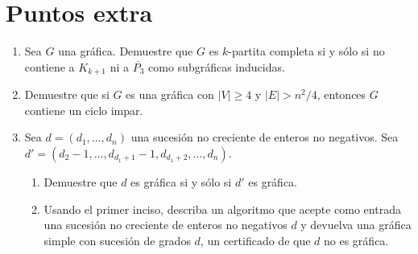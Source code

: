 \documentclass{article}
\begin{document}
\section*{Puntos extra}

\begin{enumerate}
\item Sea $G$ una gr\'afica.   Demuestre que $G$ es $k$-partita completa si y
  s\'olo si no contiene a $K_{k+1}$ ni a $\overline{P_3}$ como subgr\'aficas
  inducidas.
\item Demuestre que si $G$ es una gr\'afica con $|V| \ge 4$ y $|E| > n^2/4$,
  entonces $G$ contiene un ciclo impar.
\item Sea $d = (d_1, \dots, d_n)$ una sucesi\'on no creciente de enteros no
  negativos. Sea $d' = (d_2-1, \dots, d_{d_1+1}-1, d_{d_1+2}, \dots, d_n)$.
  \begin{enumerate}
  \item Demuestre que $d$ es gr\'afica si y s\'olo si $d'$ es gr\'afica.

  \item Usando el primer inciso, describa un algoritmo que acepte como
    entrada una sucesi\'on no creciente de enteros no negativos $d$ y
    devuelva una gr\'afica simple con sucesi\'on de grados $d$, un
    certificado de que $d$ no es gr\'afica.
  \end{enumerate}
\end{enumerate}
\end{document}
